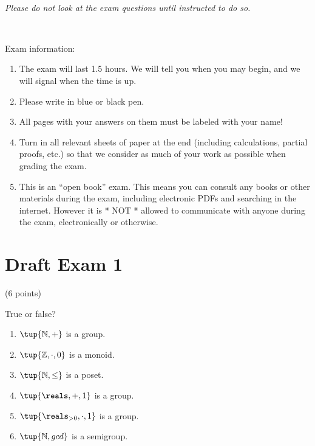 \documentclass[paper=8.125in:10.250in,pagesize=pdftex,
    headinclude=false,footinclude=false,oneside,egregdoesnotlikesansseriftitles]{kaobook}
\begin{document}
\

\emph{Please do not look at the exam questions until instructed to do so.}

\

Exam information: 
\begin{enumerate}
\item The exam will last 1.5 hours. We will tell you when you may begin, and we will signal when the time is up. 
\item Please write in blue or black pen. 
\item All pages with your answers on them must be labeled with your name!
\item Turn in all relevant sheets of paper at the end (including calculations, partial proofs, etc.) so that we consider as much of your work as possible when grading the exam. 
\item This is an ``open book'' exam. This means you can consult any books or other materials during the exam, including electronic PDFs and searching in the internet. However it is * NOT * allowed to communicate with anyone during the exam, electronically or otherwise. 
\end{enumerate}

\newpage

\section*{Draft Exam 1}


\begin{gradedexercise}\label{ex:AlgebraicGadgets}
(6 points) 
\

True or false? 
\begin{enumerate}
\item $\tup{\mathbb{N}, +}$ is a group. 
\item $\tup{\mathbb{Z}, \cdot, 0}$ is a monoid. 
\item $\tup{\mathbb{N}, \leq}$ is a poset. 
\item $\tup{\reals, +, 1}$ is a group.
\item $\tup{\reals_{>0}, \cdot, 1}$ is a group. 
\item $\tup{\mathbb{N}, gcd}$ is a semigroup. 
\end{enumerate}
\end{gradedexercise}


\newpage
\end{document}
